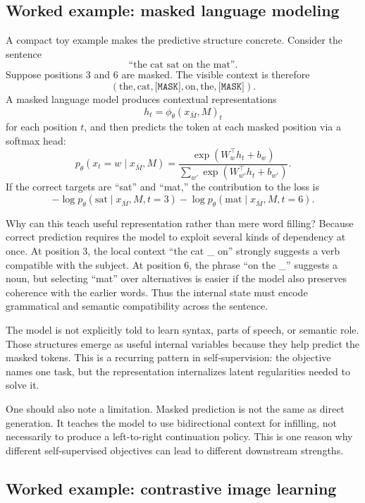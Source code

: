 \subsection*{Worked example: masked language modeling}

A compact toy example makes the predictive structure concrete.
Consider the sentence
\[
\text{``the cat sat on the mat''}.
\]
Suppose positions $3$ and $6$ are masked.
The visible context is therefore
\[
(\text{the},\text{cat},\texttt{[MASK]},\text{on},\text{the},\texttt{[MASK]}).
\]
A masked language model produces contextual representations
\[
h_t = \phi_\theta(x_{\bar M},M)_t
\]
for each position $t$, and then predicts the token at each masked position via a softmax head:
\[
p_\theta(x_t = w \mid x_{\bar M},M)
=
\frac{\exp(W_w^{\top} h_t + b_w)}{\sum_{w'} \exp(W_{w'}^{\top} h_t + b_{w'})}.
\]
If the correct targets are ``sat'' and ``mat,'' the contribution to the loss is
\[
-\log p_\theta(\text{sat} \mid x_{\bar M},M, t=3)
-\log p_\theta(\text{mat} \mid x_{\bar M},M, t=6).
\]

Why can this teach useful representation rather than mere word filling?
Because correct prediction requires the model to exploit several kinds of dependency at once.
At position $3$, the local context ``the cat \_ on'' strongly suggests a verb compatible with the subject.
At position $6$, the phrase ``on the \_'' suggests a noun, but selecting ``mat'' over alternatives is easier if the model also preserves coherence with the earlier words.
Thus the internal state must encode grammatical and semantic compatibility across the sentence.

\begin{example}
The model is not explicitly told to learn syntax, parts of speech, or semantic role.
Those structures emerge as useful internal variables because they help predict the masked tokens.
This is a recurring pattern in self-supervision: the objective names one task, but the representation internalizes latent regularities needed to solve it.
\end{example}

One should also note a limitation.
Masked prediction is not the same as direct generation.
It teaches the model to use bidirectional context for infilling, not necessarily to produce a left-to-right continuation policy.
This is one reason why different self-supervised objectives can lead to different downstream strengths.

\subsection*{Worked example: contrastive image learning}

